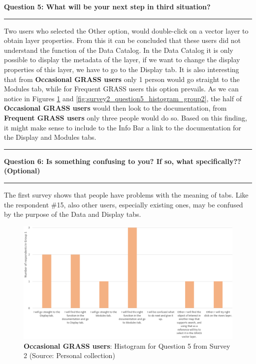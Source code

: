 \documentclass[a4paper,10pt,twoside]{article}
\begin{document}
\newpage
\noindent \textbf{Question 5:  What will be your next step in third situation?}
\par\noindent\rule{\textwidth}{0.4pt}

\noindent Two users who selected the Other option, would double-click on a vector layer to obtain layer properties. From this it can be concluded that these users did not understand the function of the Data Catalog. In the Data Catalog it is only possible to display the metadata of the layer, if we want to change the display properties of this layer, we have to go to the Display tab. It is also interesting that from \textbf{Occasional GRASS users} only 1 person would go straight to the Modules tab, while for {Frequent GRASS users} this option prevails. As we can notice in Figures \ref{fig:survey2_question5_histogram_group1} and \ref{fig:survey2_question5_histogram_group2}, the half of \textbf{Occasional GRASS users} would then look to the documentation, from \textbf{Frequent GRASS users} only three people would do so. Based on this finding, it might make sense to include to the Info Bar a link to the documentation for the Display and Modules tabs.

\par\noindent\rule{\textwidth}{0.4pt}
\noindent \textbf{Question 6: Is something confusing to you? If so, what specifically?? (Optional)}
\par\noindent\rule{\textwidth}{0.4pt}

\noindent The first survey shows that people have problems with the meaning of tabs. Like the respondent \#15, also other users, especially existing ones, may be confused by the purpose of the Data and Display tabs.

\vspace{0.3cm}
\begin{figure}[hbt!] 
\begin{center}
\includegraphics[width=17cm]{../surveys/analyzed_data/survey2_question5_histogram_group1.png} 
\caption[\textbf{Occasional GRASS users}: Histogram for Question 5 from Survey 2]{\textbf{Occasional GRASS users}: Histogram for Question 5 from Survey 2 (Source: Personal collection)}
\label{fig:survey2_question5_histogram_group1}
\end{center}
\end{figure}
\end{document}

